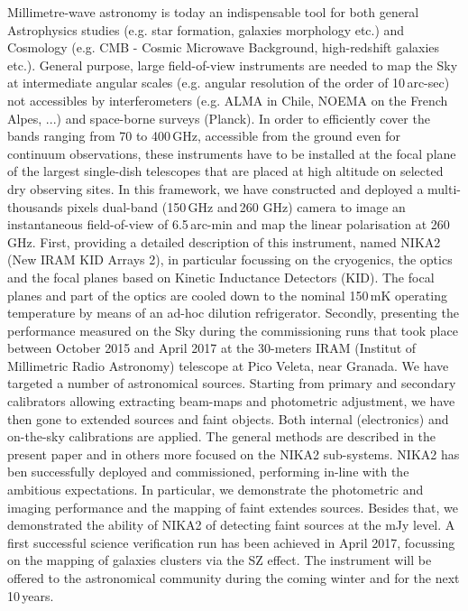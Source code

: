 \documentclass[]{aa} %
\begin{document}
  \abstract
   {Millimetre-wave astronomy is today an indispensable tool for both general Astrophysics studies (e.g. star formation, galaxies morphology etc.) and Cosmology (e.g. CMB - Cosmic Microwave Background, high-redshift galaxies etc.). General purpose, large field-of-view instruments are needed to map the Sky at intermediate angular scales (e.g. angular resolution of the order of 10\,arc-sec) not accessibles by interferometers (e.g. ALMA in Chile, NOEMA on the French Alpes, ...) and space-borne surveys (Planck). In order to efficiently cover the bands ranging from 70 to 400\,GHz, accessible from the ground even for continuum observations, these instruments have to be installed at the focal plane of the largest single-dish telescopes that are placed at high altitude on selected dry observing sites. In this framework, we have constructed and deployed a multi-thousands pixels dual-band (150\,GHz and\,260 GHz) camera to image an instantaneous field-of-view of 6.5\,arc-min and map the linear polarisation at 260\,GHz.}
   {First, providing a detailed description of this instrument, named NIKA2 (New IRAM KID Arrays 2), in particular focussing on the cryogenics, the optics  and the focal planes based on Kinetic Inductance Detectors (KID). The focal planes and part of the optics are cooled down to the nominal 150\,mK operating temperature by means of an ad-hoc dilution refrigerator. 
Secondly, presenting the performance measured on the Sky during the commissioning runs that took place between October 2015 and April 2017 at the 30-meters IRAM (Institut of Millimetric Radio Astronomy) telescope at Pico Veleta, near Granada.}
   {We have targeted a number of astronomical sources. Starting from primary and secondary calibrators allowing extracting beam-maps and photometric adjustment, we have then gone to extended sources and faint objects. Both internal (electronics) and on-the-sky calibrations are applied. The general methods are described in the present paper and in others more focused on the NIKA2 sub-systems.}
   {NIKA2 has ben successfully deployed and commissioned, performing in-line with the ambitious expectations. In particular, we demonstrate the photometric and imaging performance and the mapping of faint extendes sources. Besides that, we demonstrated the ability of NIKA2 of detecting faint sources at the mJy level. A first successful science verification run has been achieved in April 2017, focussing on the mapping of galaxies clusters via the SZ effect. The instrument will be offered to the astronomical community during the coming winter and for the next 10\,years.
}
   {}
\end{document}
